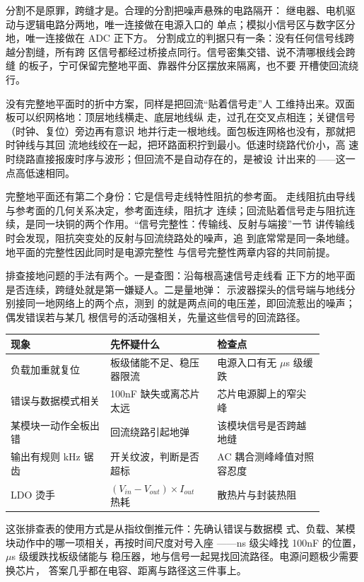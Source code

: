 分割不是原罪，跨缝才是。合理的分割把噪声悬殊的电路隔开：
继电器、电机驱动与逻辑电路分两地，唯一连接做在电源入口的
单点；模拟小信号区与数字区分地，唯一连接做在 ADC 正下方。
分割成立的判据只有一条：没有任何信号线跨越分割缝，所有跨
区信号都经过桥接点同行。信号密集交错、说不清哪根线会跨缝
的板子，宁可保留完整地平面、靠器件分区摆放来隔离，也不要
开槽使回流绕行。

没有完整地平面时的折中方案，同样是把回流“贴着信号走”人
工维持出来。双面板可以织网格地：顶层地线横走、底层地线纵
走，过孔在交叉点相连；关键信号（时钟、复位）旁边再有意识
地并行走一根地线。面包板连网格也没有，那就把时钟线与其回
流地线绞在一起，把环路面积拧到最小。低速时绕路代价小，高
速时绕路直接报废时序与波形；但回流不是自动存在的，是被设
计出来的——这一点高低速相同。

完整地平面还有第二个身份：它是信号走线特性阻抗的参考面。
走线阻抗由导线与参考面的几何关系决定，参考面连续，阻抗才
连续；回流贴着信号走与阻抗连续，是同一块铜的两个作用。“信号完整性：传输线、反射与端接”一节
讲传输线时会发现，阻抗突变处的反射与回流绕路处的噪声，追
到底常常是同一条地缝。地平面的完整性因此同时是电源完整性
与信号完整性两章内容的共同前提。

排查接地问题的手法有两个。一是查图：沿每根高速信号走线看
正下方的地平面是否连续，跨缝处就是第一嫌疑人。二是量地弹：
示波器探头的信号端与地线分别接同一地网络上的两个点，测到
的就是两点间的电压差，即回流惹出的噪声；偶发错误若与某几
根信号的活动强相关，先量这些信号的回流路径。

\begin{longtable}{L{0.28\linewidth}L{0.3\linewidth}L{0.3\linewidth}}
\toprule
现象 & 先怀疑什么 & 检查点 \\
\midrule
负载加重就复位 & 板级储能不足、稳压器限流 & 电源入口有无 $\mu$s 级缓跌 \\\tablerowrule
错误与数据模式相关 & 100nF 缺失或离芯片太远 & 芯片电源脚上的窄尖峰 \\\tablerowrule
某模块一动作全板出错 & 回流绕路引起地弹 & 该模块信号是否跨越地缝 \\\tablerowrule
输出有规则 kHz 锯齿 & 开关纹波，判断是否超标 & AC 耦合测峰峰值对照容忍度 \\\tablerowrule
LDO 烫手 & $(V_{in}-V_{out}) \times I_{out}$ 热耗 & 散热片与封装热阻 \\
\bottomrule
\end{longtable}

这张排查表的使用方式是从指纹倒推元件：先确认错误与数据模
式、负载、某模块动作中的哪一项相关，再按时间尺度对号入座
——ns 级尖峰找 100nF 的位置，$\mu$s 级缓跌找板级储能与
稳压器，地与信号一起晃找回流路径。电源问题极少需要换芯片，
答案几乎都在电容、距离与路径这三件事上。

